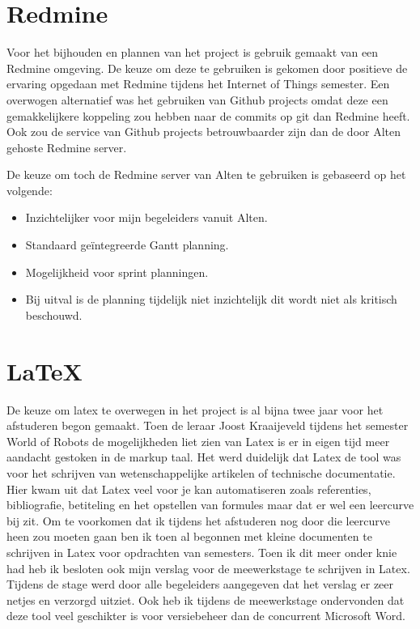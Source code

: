 \documentclass[a4paper, 11pt, oneside]{report}
\begin{document}
\section{Redmine}

Voor het bijhouden en plannen van het project is gebruik gemaakt van een Redmine omgeving. 
De keuze om deze te gebruiken is gekomen door positieve de ervaring opgedaan met Redmine tijdens het Internet of Things semester.
Een overwogen alternatief was het gebruiken van Github projects omdat deze een gemakkelijkere koppeling zou hebben naar de commits op git dan Redmine heeft. Ook zou de service van Github projects betrouwbaarder zijn dan de door Alten gehoste Redmine server.

De keuze om toch de Redmine server van Alten te gebruiken is gebaseerd op het volgende:
\begin{itemize}
	\item Inzichtelijker voor mijn begeleiders vanuit Alten. 
	\item Standaard geïntegreerde Gantt planning.
	\item Mogelijkheid voor sprint planningen.
	\item Bij uitval is de planning tijdelijk niet inzichtelijk dit wordt niet als kritisch beschouwd.  
\end{itemize}   


\section{\LaTeX}

De keuze om latex te overwegen in het project is al bijna twee jaar voor het afstuderen begon gemaakt. 
Toen de leraar Joost Kraaijeveld tijdens het semester World of Robots de mogelijkheden liet zien van Latex is er in eigen tijd meer aandacht gestoken in de markup taal.
Het werd duidelijk dat Latex de tool was voor het schrijven van wetenschappelijke artikelen of technische documentatie.
Hier kwam uit dat Latex veel voor je kan automatiseren zoals referenties, bibliografie, betiteling en het opstellen van formules maar dat er wel een leercurve bij zit.
Om te voorkomen dat ik tijdens het afstuderen nog door die leercurve heen zou moeten gaan ben ik toen al begonnen met kleine documenten te schrijven in Latex voor opdrachten van semesters.
Toen ik dit meer onder knie had heb ik besloten ook mijn verslag voor de meewerkstage te schrijven in Latex.
Tijdens de stage werd door alle begeleiders aangegeven dat het verslag er zeer netjes en verzorgd uitziet.
Ook heb ik tijdens de meewerkstage ondervonden dat deze tool veel geschikter is voor versiebeheer dan de concurrent Microsoft Word.
\end{document}
